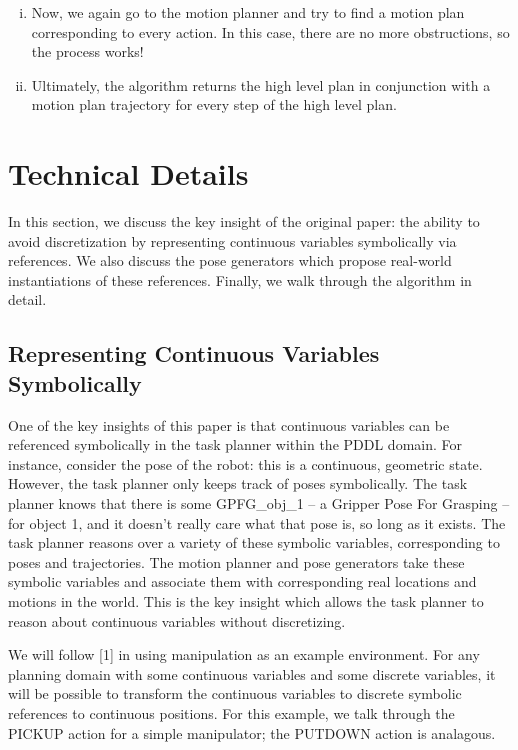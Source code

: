 \documentclass[12pt]{article}
\begin{document}
\begin{enumerate}[i.]
\item Now, we again go to the motion planner and try to find a motion plan corresponding to every action.
In this case, there are no more obstructions, so the process works!

\item Ultimately, the algorithm returns the high level plan in conjunction with a motion plan trajectory for every step of the high level plan.

\end{enumerate}

\section{Technical Details}

In this section, we discuss the key insight of the original paper: the ability to avoid discretization by representing continuous variables symbolically via references.  
We also discuss the pose generators which propose real-world instantiations of these references.  
Finally, we walk through the algorithm in detail.

\subsection{Representing Continuous Variables Symbolically}

One of the key insights of this paper is that continuous variables can be referenced symbolically in the task planner within the PDDL domain.  
For instance, consider the pose of the robot: this is a continuous, geometric state.  However, the task planner only keeps track of poses symbolically.  
The task planner knows that there is some GPFG\_obj\_1 -- a Gripper Pose For Grasping -- for object 1, and it doesn't really care what that pose is, so long as it exists.  
The task planner reasons over a variety of these symbolic variables, corresponding to poses and trajectories.  
The motion planner and pose generators take these symbolic variables and associate them with corresponding real locations and motions in the world.  
This is the key insight which allows the task planner to reason about continuous variables without discretizing.  

We will follow [1] in using manipulation as an example environment.  For any planning domain with some continuous variables and some discrete variables, it will be possible to transform the continuous variables to discrete symbolic references to continuous positions.  For this example, we talk through the PICKUP action for a simple manipulator; the PUTDOWN action is analagous.
\end{document}
